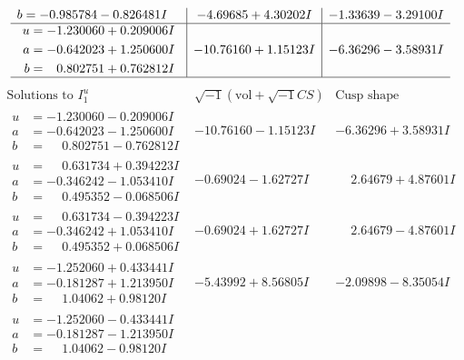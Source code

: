 \documentclass[1p]{elsarticle_modified}
\theoremstyle{definition}
\newcommand{\I}{\sqrt{-1}}
\begin{document}
$$\begin{array}{c|c|c}
\begin{aligned}
b &= -0.985784 - 0.826481 I\end{aligned}
 & -4.69685 + 4.30202 I & -1.33639 - 3.29100 I \\ \hline\begin{aligned}
u &= -1.230060 + 0.209006 I \\
a &= -0.642023 + 1.250600 I \\
b &= \phantom{-}0.802751 + 0.762812 I\end{aligned}
 & -10.76160 + 1.15123 I & -6.36296 - 3.58931 I\\
 \hline 
 \end{array}$$\newpage$$\begin{array}{c|c|c}  
\text{Solutions to }I^u_{1}& \I (\text{vol} + \sqrt{-1}CS) & \text{Cusp shape}\\
 \hline 
\begin{aligned}
u &= -1.230060 - 0.209006 I \\
a &= -0.642023 - 1.250600 I \\
b &= \phantom{-}0.802751 - 0.762812 I\end{aligned}
 & -10.76160 - 1.15123 I & -6.36296 + 3.58931 I \\ \hline\begin{aligned}
u &= \phantom{-}0.631734 + 0.394223 I \\
a &= -0.346242 - 1.053410 I \\
b &= \phantom{-}0.495352 - 0.068506 I\end{aligned}
 & -0.69024 - 1.62727 I & \phantom{-}2.64679 + 4.87601 I \\ \hline\begin{aligned}
u &= \phantom{-}0.631734 - 0.394223 I \\
a &= -0.346242 + 1.053410 I \\
b &= \phantom{-}0.495352 + 0.068506 I\end{aligned}
 & -0.69024 + 1.62727 I & \phantom{-}2.64679 - 4.87601 I \\ \hline\begin{aligned}
u &= -1.252060 + 0.433441 I \\
a &= -0.181287 + 1.213950 I \\
b &= \phantom{-}1.04062 + 0.98120 I\end{aligned}
 & -5.43992 + 8.56805 I & -2.09898 - 8.35054 I \\ \hline\begin{aligned}
u &= -1.252060 - 0.433441 I \\
a &= -0.181287 - 1.213950 I \\
b &= \phantom{-}1.04062 - 0.98120 I\end{aligned}

\end{array}$$
\end{document}
